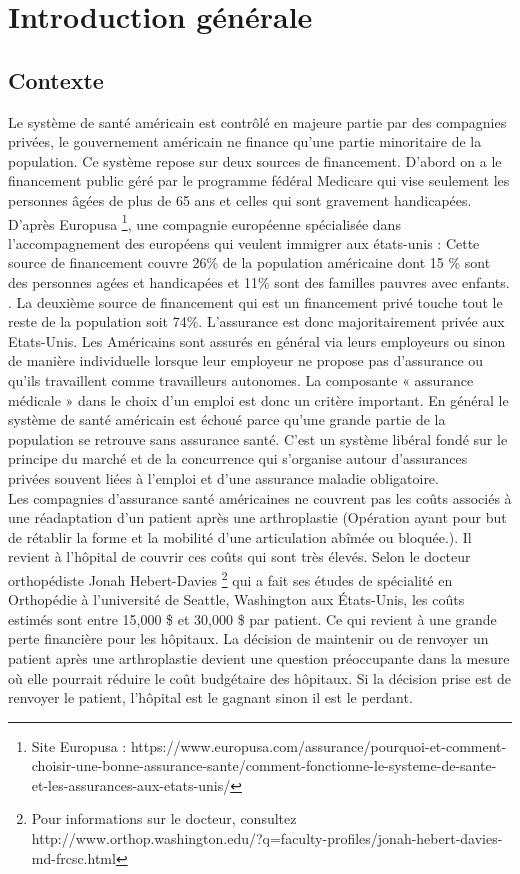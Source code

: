 \documentclass[12pt, french]{report}
\begin{document}
\newpage
\chapter{Introduction générale}	
\section{Contexte}
Le système de santé américain est contrôlé en majeure partie par des compagnies privées, le gouvernement américain ne finance qu'une partie minoritaire de la population. Ce système  repose sur deux sources de financement. D'abord on a le financement public géré par le programme fédéral Medicare qui vise seulement les personnes âgées de plus de 65 ans et celles qui sont gravement handicapées. D'après Europusa \footnote{Site Europusa : https://www.europusa.com/assurance/pourquoi-et-comment-choisir-une-bonne-assurance-sante/comment-fonctionne-le-systeme-de-sante-et-les-assurances-aux-etats-unis/}, une compagnie européenne spécialisée dans l'accompagnement des européens qui veulent immigrer aux états-unis : \guillemotleft Cette source de financement couvre 26\% de la population américaine dont 15 \% sont des personnes agées et handicapées et 11\% sont des familles pauvres avec enfants.  \guillemotright. La deuxième source de financement qui est un financement privé touche tout le reste de la population soit 74\%. L’assurance est donc majoritairement privée aux Etats-Unis. Les Américains sont assurés en général via leurs employeurs ou sinon de manière individuelle lorsque leur employeur ne propose pas d’assurance ou qu’ils travaillent comme travailleurs autonomes. La composante « 	assurance médicale » dans le choix d’un emploi est donc un critère important. En général le système de santé américain est échoué parce qu'une grande partie de la population se retrouve sans assurance santé. C'est un système libéral fondé sur le principe du marché et de la concurrence qui s’organise autour d’assurances privées souvent liées à l’emploi et d’une assurance maladie obligatoire. \\

Les compagnies d'assurance santé américaines ne couvrent pas les coûts associés à une réadaptation d'un patient après une arthroplastie (Opération ayant pour but de rétablir la forme et la mobilité d'une articulation abîmée ou bloquée.). Il revient à l'hôpital de couvrir ces coûts qui sont très élevés. Selon le docteur orthopédiste Jonah Hebert-Davies \footnote{Pour informations sur le docteur, consultez http://www.orthop.washington.edu/?q=faculty-profiles/jonah-hebert-davies-md-frcsc.html} qui a fait ses études de spécialité en Orthopédie à l'université de Seattle, Washington aux États-Unis, les coûts estimés sont entre 15,000 \$ et 30,000 \$ par patient. Ce qui revient à une grande perte financière pour les hôpitaux.  La décision de maintenir ou de renvoyer un patient après une arthroplastie devient une question préoccupante dans la mesure où elle pourrait réduire le coût budgétaire des hôpitaux. Si la décision prise est de renvoyer le patient, l'hôpital est le gagnant sinon il est le perdant. \\ 
\end{document}
